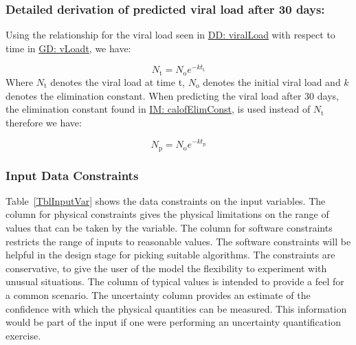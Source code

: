 \documentclass[12pt]{article}
\begin{document}
\subsubsection*{Detailed derivation of predicted viral load after 30 days:}

\label{IM:calofPredictedVLDeriv}
Using the relationship for the viral load seen in \hyperref[DD_viralload]{DD: 
viralLoad} with respect to time in \hyperref[GD_vLoadt]{GD: vLoadt}, we have:

\begin{displaymath}
{N_{\text{t}}}={N_{\text{o}}} e^{-k {t_{\text{t}}}}
\end{displaymath}
Where ${N_{\text{t}}}$ denotes the viral load at time t, ${N_{\text{o}}}$ 
denotes the initial viral load and $k$ denotes the elimination constant. When 
predicting the viral load after 30 days, the elimination constant  found in 
\hyperref[VLelimination]{IM: calofElimConst},  is used instead of 
${N_{\text{t}}}$  therefore we have:

\begin{displaymath}
{N_{\text{p}}}={N_{\text{o}}} e^{-k {t_{\text{p}}}}
\end{displaymath}



\subsubsection{Input Data Constraints} \label{sec_DataConstraints}    

Table~\ref{TblInputVar} shows the data constraints on the input 
variables.  The column for physical constraints gives the physical limitations
on the range of values that can be taken by the variable.  The column for
software constraints restricts the range of inputs to reasonable values.  The
software constraints will be helpful in the design stage for picking suitable
algorithms.  The constraints are conservative, to give the user of the model the
flexibility to experiment with unusual situations.  The column of typical values
is intended to provide a feel for a common scenario.  The uncertainty column
provides an estimate of the confidence with which the physical quantities can be
measured.  This information would be part of the input if one were performing an
uncertainty quantification exercise.
\end{document}

